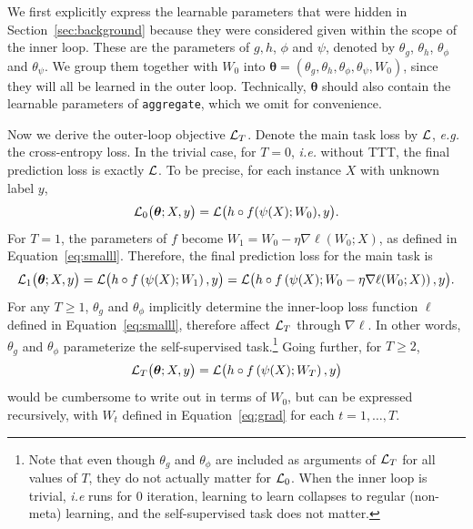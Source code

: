 \documentclass{article} %
\begin{document}
We first explicitly express the learnable parameters that were hidden in Section~\ref{sec:background} because they were considered given within the scope of the inner loop.
These are the parameters of $g, h$, $\phi$ and $\psi$, denoted by $\theta_g$, $\theta_h$, $\theta_\phi$ and $\theta_\psi$. 
We group them together with $W_0$ into $\boldsymbol{\theta} = (\theta_g, \theta_h, \theta_\phi, \theta_\psi, W_0)$, since they will all be learned in the outer loop.
Technically, $\boldsymbol{\theta}$ should also contain the learnable parameters of \texttt{aggregate}, which we omit for convenience.

Now we derive the outer-loop objective $\mathcal{L}_T$.
Denote the main task loss by $\mathcal{L}$, \textit{e.g.} the cross-entropy loss.
In the trivial case, for $T=0$, \textit{i.e.} without TTT, the final prediction loss is exactly $\mathcal{L}$.
To be precise, for each instance $X$ with unknown label $y$,
\begin{equation}
\mathcal{L}_0 \big( \boldsymbol{\theta}; X, y \big) 
= \mathcal{L} \big( h\circ f(\psi(X); W_0), y \big).
\end{equation}
For $T=1$, the parameters of $f$ become $W_1 = W_0 - \eta\nabla\ell(W_0; X)$, as defined in Equation~\ref{eq:smalll}.
Therefore, the final prediction loss for the main task is
\begin{equation}
\label{eq:bigl}
\mathcal{L}_1\big( \boldsymbol{\theta}; X, y \big) = 
\mathcal{L}\big( h\circ f\left(\psi(X); W_1\right), y \big)
= \mathcal{L}\big( h\circ f\left(\psi(X); W_0 - \eta\nabla\ell(W_0; X)\right), y \big).
\end{equation}
For any $T\geq 1$, $\theta_g$ and $\theta_\phi$ implicitly determine the inner-loop loss function $\ell$ defined in Equation~\ref{eq:smalll}, therefore affect $\mathcal{L}_T$ through $\nabla\ell$.
In other words, $\theta_g$ and $\theta_\phi$ parameterize the self-supervised task.\footnote{Note that even though $\theta_g$ and $\theta_\phi$ are included as arguments of $\mathcal{L}_T$ for all values of $T$, they do not actually matter for $\mathcal{L}_0$.
When the inner loop is trivial, \textit{i.e} runs for 0 iteration, learning to learn collapses to regular (non-meta) learning, and the self-supervised task does not matter.
}
Going further, for $T \geq 2$, 
\begin{equation}
    \mathcal{L}_T \big( \boldsymbol{\theta}; X, y \big) =
    \mathcal{L}\big( h\circ f\left(\psi(X); W_T\right), y \big)
\end{equation}
would be cumbersome to write out in terms of $W_0$, but can be expressed recursively, with $W_t$ defined in Equation~\ref{eq:grad} for each $t=1,\dots,T$.
\end{document}

